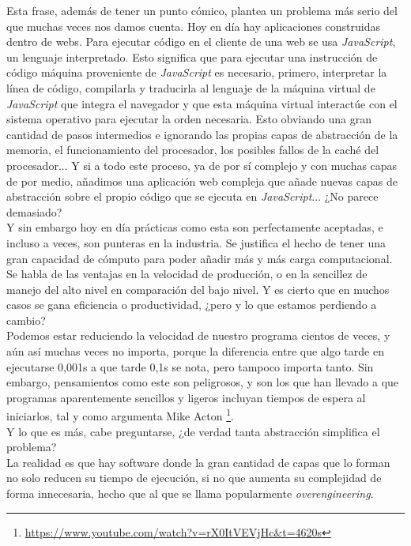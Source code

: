 Esta frase, además de tener un punto cómico, plantea un problema más serio del que muchas veces nos damos cuenta. Hoy en día hay aplicaciones construidas dentro de webs. Para ejecutar código en el cliente de una web se usa \emph{JavaScript}, un lenguaje interpretado. Esto significa que para ejecutar una instrucción de código máquina proveniente de \emph{JavaScript} es necesario, primero, interpretar la línea de código, compilarla y traducirla al lenguaje de la máquina virtual de \emph{JavaScript} que integra el navegador y que esta máquina virtual interactúe con el sistema operativo para ejecutar la orden necesaria. Esto obviando una gran cantidad de pasos intermedios e ignorando las propias capas de abstracción de la memoria, el funcionamiento del procesador, los posibles fallos de la caché del procesador... Y si a todo este proceso, ya de por sí complejo y con muchas capas de por medio, añadimos una aplicación web compleja que añade nuevas capas de abstracción sobre el propio código que se ejecuta en \emph{JavaScript}... ¿No parece demasiado?\\

Y sin embargo hoy en día prácticas como esta son perfectamente aceptadas, e incluso a veces, son punteras en la industria. Se justifica el hecho de tener una gran capacidad de cómputo para poder añadir más y más carga computacional. Se habla de las ventajas en la velocidad de producción, o en la sencillez de manejo del alto nivel en comparación del bajo nivel. Y es cierto que en muchos casos se gana eficiencia o productividad, ¿pero y lo que estamos perdiendo a cambio?\\

Podemos estar reduciendo la velocidad de nuestro programa cientos de veces, y aún así muchas veces no importa, porque la diferencia entre que algo tarde en ejecutarse 0,001s a que tarde 0,1s se nota, pero tampoco importa tanto. Sin embargo, pensamientos como este son peligrosos, y son los que han llevado a que programas aparentemente sencillos y ligeros incluyan tiempos de espera al iniciarlos, tal y como argumenta Mike Acton                           \footnote{\url{https://www.youtube.com/watch?v=rX0ItVEVjHc&t=4620s}}.\\

Y lo que es más, cabe preguntarse, ¿de verdad tanta abstracción simplifica el problema?\\

La realidad es que hay software donde la gran cantidad de capas que lo forman no solo reducen su tiempo de ejecución, si no que aumenta su complejidad de forma innecesaria, hecho que al que se llama popularmente \emph{overengineering}.\\

